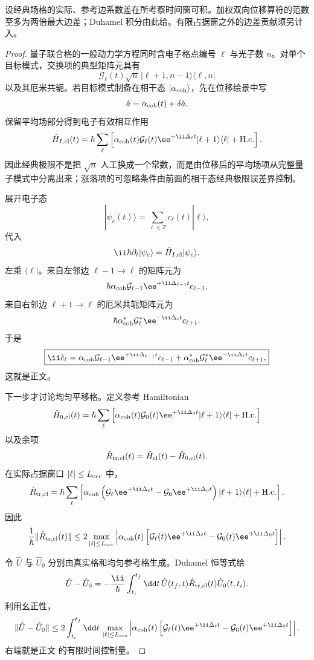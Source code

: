 \begin{proposition}[经典相干格的均匀化误差]
设经典场格的实际、参考边系数差在所考察时间窗可积。加权双向位移算符的范数至多为两倍最大边差；Duhamel 积分由此给。有限占据窗之外的边差贡献须另计入。
\end{proposition}
\begin{proof}
量子联合格的一般动力学方程同时含电子格点编号 $\ell$ 与光子数 $n$。对单个目标模式，交换项的典型矩阵元具有
\[
\mathcal G_\ell(t)
\sqrt{n}\,
|\ell+1,n-1\rangle\langle\ell,n|
\]
以及其厄米共轭。若目标模式制备在相干态 $|\alpha_{\rm coh}\rangle$，先在位移绘景中写
\[
\hat a
=
\alpha_{\rm coh}(t)
+\delta\hat a.
\]
保留平均场部分得到电子有效相互作用
\[
\hat H_{I,\rm cl}(t)
=
\hbar\sum_\ell
\left[
\alpha_{\rm coh}(t)
\mathcal G_\ell(t)
\ee^{+\ii\Delta_\ell t}
|\ell+1\rangle\langle\ell|
+\mathrm{H.c.}
\right].
\]
因此经典极限不是把 $\sqrt n$ 人工换成一个常数，而是由位移后的平均场项从完整量子模式中分离出来；涨落项的可忽略条件由前面的相干态经典极限误差界控制。

展开电子态
\[
|\psi_e(t)\rangle
=
\sum_{\ell\in\mathbb Z}
c_\ell(t)|\ell\rangle,
\]
代入
\[
\ii\hbar\partial_t|\psi_e\rangle
=
\hat H_{I,\rm cl}|\psi_e\rangle.
\]
左乘 $\langle\ell|$。来自左邻边 $\ell-1\to\ell$ 的矩阵元为
\[
\hbar
\alpha_{\rm coh}
\mathcal G_{\ell-1}
\ee^{+\ii\Delta_{\ell-1}t}
c_{\ell-1},
\]
来自右邻边 $\ell+1\to\ell$ 的厄米共轭矩阵元为
\[
\hbar
\alpha_{\rm coh}^*
\mathcal G_\ell^*
\ee^{-\ii\Delta_\ell t}
c_{\ell+1}.
\]
于是
\[
\boxed{
\ii\dot c_\ell
=
\alpha_{\rm coh}\mathcal G_{\ell-1}
\ee^{+\ii\Delta_{\ell-1}t}c_{\ell-1}
+
\alpha_{\rm coh}^*\mathcal G_\ell^*
\ee^{-\ii\Delta_\ell t}c_{\ell+1},
}
\]
这就是正文。

下一步才讨论均匀平移格。定义参考 Hamiltonian
\[
\hat H_{0,\rm cl}(t)
=
\hbar\sum_\ell
\left[
\alpha_{\rm coh}(t)\mathcal G_0(t)
\ee^{+\ii\Delta_0 t}
|\ell+1\rangle\langle\ell|
+\mathrm{H.c.}
\right]
\]
以及余项
\[
\hat R_{\rm tr,cl}(t)
=
\hat H_{\rm cl}(t)-\hat H_{0,\rm cl}(t).
\]
在实际占据窗口 $|\ell|\le L_{\rm occ}$ 中，
\[
\hat R_{\rm tr,cl}
=
\hbar\sum_\ell
\left[
\alpha_{\rm coh}
\left(
\mathcal G_\ell\ee^{+\ii\Delta_\ell t}
-\mathcal G_0\ee^{+\ii\Delta_0t}
\right)
|\ell+1\rangle\langle\ell|
+\mathrm{H.c.}
\right].
\]
因此
\[
\frac1\hbar
\|\hat R_{\rm tr,cl}(t)\|
\le
2
\max_{|\ell|\le L_{\rm occ}}
\left|
\alpha_{\rm coh}(t)
\left[
\mathcal G_\ell(t)\ee^{+\ii\Delta_\ell t}
-\mathcal G_0(t)\ee^{+\ii\Delta_0t}
\right]
\right|.
\]

令 $\hat U$ 与 $\hat U_0$ 分别由真实格和均匀参考格生成。Duhamel 恒等式给
\[
\hat U-\hat U_0
=
-\frac{\ii}{\hbar}
\int_{t_i}^{t_f}\dd t\,
\hat U(t_f,t)
\hat R_{\rm tr,cl}(t)
\hat U_0(t,t_i).
\]
利用幺正性，
\[
\|\hat U-\hat U_0\|
\le
2\int_{t_i}^{t_f}\dd t\,
\max_{|\ell|\le L_{\rm occ}}
\left|
\alpha_{\rm coh}(t)
\left[
\mathcal G_\ell(t)\ee^{+\ii\Delta_\ell t}
-\mathcal G_0(t)\ee^{+\ii\Delta_0t}
\right]
\right|.
\]
右端就是正文 的有限时间控制量。


\end{proof}
